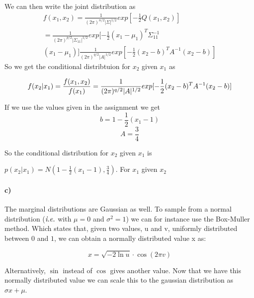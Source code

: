 \documentclass{article}
\begin{document}
We can then write the joint distribution as
\begin{equation*}
  \begin{split}
 f(x_1,x_2) = \frac{1}{(2\pi)^{n/2}|\Sigma|^{1/2}}exp[-\frac{1}{2}Q(x_1,x_2)] \\ 
  = \frac{1}{(2\pi)^{p/2}|\Sigma_{11}|^{1/2}}exp[-\frac{1}{2}(x_1 - \mu_1)^T\Sigma_{11}^{-1}\\
  (x_1 - \mu_1)]\frac{1}{(2\pi)^{q/2}|A|^{1/2}}exp[-\frac{1}{2}(x_2-b)^TA^{-1}(x_2-b)]
\end{split}
\end{equation*}
So we get the conditional distribtuion for $x_2$ given $x_1$ as

$$f(x_2|x_1) = \frac{f(x_1,x_2)}{f(x_1)} \\ 
= \frac{1}{(2\pi)^{q/2}|A|^{1/2}}exp[-\frac{1}{2}(x_2-b)^TA^{-1}(x_2 - b)]$$

If we use the values given in the assignment we get
$$ b = 1 -\frac{1}{2}(x_1 - 1) $$
$$ A = \frac{3}{4}$$ 

So the conditional distribution for $x_2$ given $x_1$ is

$p(x_2|x_1) = N(1 - \frac{1}{2}(x_1 - 1), \frac{3}{4})$. For $x_1$ given $x_2$ 



\paragraph{c)}

The marginal distributions are Gaussian as well. To sample from a normal
distribution ($\emph{i.e.}$ with $\mu = 0$ and $\sigma^2 = 1$) we can for
instance use the Box-Muller method. Which states that, given two values, u and
v, uniformly distributed between $0$ and $1$, we can obtain a normally
distributed value x as:

\begin{equation}
  x = \sqrt{-2 \ln u } \cdot \cos \left(2 \pi v \right)
\end{equation}

Alternatively, $\sin$ instead of $\cos$ gives another value. \newline
Now that we have this normally distributed value we can scale this to the
gaussian distribution as $\sigma x + \mu$.
\end{document}
